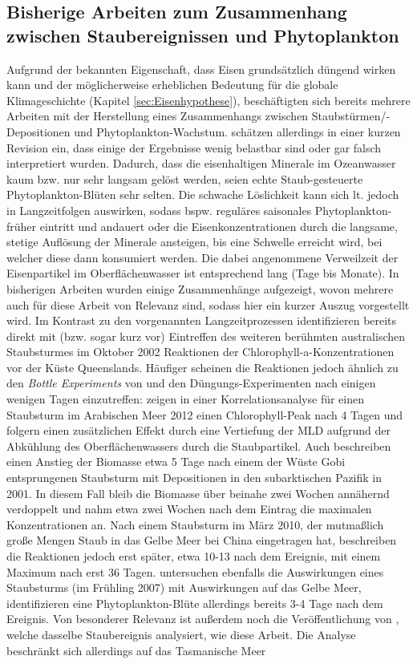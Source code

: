 \documentclass[12pt,a4paper,onecolumn,headheight=30pt]{scrartcl}
\begin{document}
\subsection{Bisherige Arbeiten zum Zusammenhang zwischen Staubereignissen und Phytoplankton}
Aufgrund der bekannten Eigenschaft, dass Eisen grundsätzlich düngend wirken kann und der möglicherweise erheblichen Bedeutung für die globale Klimageschichte (Kapitel \ref{sec:Eisenhypothese}), beschäftigten sich bereits mehrere Arbeiten mit der Herstellung eines Zusammenhangs zwischen Staubstürmen/-Depositionen und Phytoplankton-Wachstum. \citet{Boyd.2010} schätzen allerdings in einer kurzen Revision ein, dass einige der Ergebnisse wenig belastbar sind oder gar falsch interpretiert wurden. Dadurch, dass die eisenhaltigen Minerale im Ozeanwasser kaum bzw. nur sehr langsam gelöst werden, seien echte Staub-gesteuerte Phytoplankton-Blüten sehr selten. Die schwache Löslichkeit kann sich lt. \citet{Boyd.2010} jedoch in Langzeitfolgen auswirken, sodass bspw. reguläres saisonales Phytoplankton- früher eintritt und andauert oder die Eisenkonzentrationen durch die langsame, stetige Auflösung der Minerale ansteigen, bis eine Schwelle erreicht wird, bei welcher diese dann konsumiert werden. Die dabei angenommene Verweilzeit der Eisenpartikel im Oberflächenwasser ist entsprechend lang (Tage bis Monate). In bisherigen Arbeiten wurden einige Zusammenhänge aufgezeigt, wovon mehrere auch für diese Arbeit von Relevanz sind, sodass hier ein kurzer Auszug vorgestellt wird. Im Kontrast zu den vorgenannten Langzeitprozessen identifizieren \citet{Shaw.2008} bereits direkt mit (bzw. sogar kurz vor) Eintreffen des weiteren berühmten australischen Staubsturmes im Oktober 2002 Reaktionen der Chlorophyll-a-Konzentrationen vor der Küste Queenslands. Häufiger scheinen die Reaktionen jedoch ähnlich zu den \textit{Bottle Experiments} von \citet{Martin.1988} und den Düngungs-Experimenten \citep{Trull.2001} nach einigen wenigen Tagen einzutreffen: \citet{Bali.2019} zeigen in einer Korrelationsanalyse für einen Staubsturm im Arabischen Meer 2012 einen Chlorophyll-Peak nach 4 Tagen und folgern einen zusätzlichen Effekt durch eine Vertiefung der MLD aufgrund der Abkühlung des Oberflächenwassers durch die Staubpartikel. Auch \citet{Bishop.2002} beschreiben einen Anstieg der Biomasse etwa 5 Tage nach einem der Wüste Gobi entsprungenen Staubsturm mit Depositionen in den subarktischen Pazifik in 2001. In diesem Fall bleib die Biomasse über beinahe zwei Wochen annähernd verdoppelt und nahm etwa zwei Wochen nach dem Eintrag die maximalen Konzentrationen an. Nach einem Staubsturm im März 2010, der mutmaßlich große Mengen Staub in das Gelbe Meer bei China eingetragen hat, beschreiben \citet{Tan.2014} die Reaktionen jedoch erst später, etwa 10-13 nach dem Ereignis, mit einem Maximum nach erst 36 Tagen. \citet{Shi.2012} untersuchen ebenfalls die Auswirkungen eines Staubsturms (im Frühling 2007) mit Auswirkungen auf das Gelbe Meer, identifizieren eine Phytoplankton-Blüte allerdings bereits 3-4 Tage nach dem Ereignis. Von besonderer Relevanz ist außerdem noch die Veröffentlichung von \citet{Gabric.2016}, welche dasselbe Staubereignis analysiert, wie  diese Arbeit. Die Analyse beschränkt sich allerdings auf das Tasmanische Meer 
\end{document}
